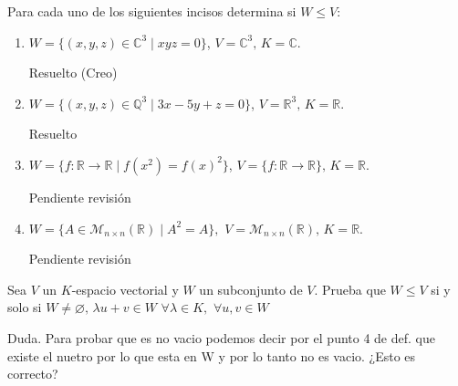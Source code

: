 \begin{exercise}{}{}

Para cada uno de los siguientes incisos determina si $W \leq V$:
\begin{enumerate}
    \item $W= \{ (x,y,z) \in \mathbb{C}^3 \mid xyz=0\}$, $V= \mathbb{C}^3, \, K = \mathbb{C}$.
\begin{solution}{}{}
Resuelto (Creo)
\end{solution}

    \item $W= \{ (x,y,z) \in \mathbb{Q}^3 \mid 3x-5y+z=0\}$, $V= \mathbb{R}^3, \, K = \mathbb{R}$.
\begin{solution}{}{}
    Resuelto
\end{solution}


    \item $W= \{ f: \mathbb{R} \rightarrow \mathbb{R} \mid f(x^2) = f(x)^2\}$, $V=\{f: \mathbb{R} \rightarrow \mathbb{R}\}, \, K = \mathbb{R}$.
\begin{solution}{}{}
    Pendiente revisión
\end{solution}

    \item $W = \{A \in \mathcal{M}_{n \times n} (\mathbb{R}) \mid A^2 = A\}, \, \, V = \mathcal{M}_{n \times n} (\mathbb{R}), \, K = \mathbb{R}$.
\begin{solution}{}{}
Pendiente revisión
\end{solution}
        
\end{enumerate}

\end{exercise}


\begin{exercise}{}{}
Sea $V$ un $K$-espacio vectorial y $W$ un subconjunto de $V$. Prueba que $W \leq V$ si y solo si $W \neq \varnothing, \, \lambda u + v \in W \, \, \forall \lambda \in K, \, \, \forall u, v \in W$ 

\begin{solution}{}{}
Duda. Para probar que es no vacio podemos decir por el punto 4 de def. que existe el nuetro por lo que esta en W y por lo tanto no es vacio. ¿Esto es correcto?
\end{solution}

\end{exercise}

